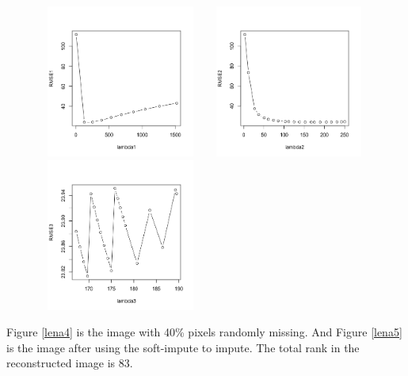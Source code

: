 \documentclass[12pt]{article}
\begin{document}
\begin{figure}[H]
	\centering
	\begin{minipage}[c]{0.32\textwidth}
		\centering
		\includegraphics[angle=0,width=5.5cm,height=5cm]{lena1}
		\caption{}\label{lena1}
	\end{minipage}
	\begin{minipage}[c]{0.32\textwidth}
		\centering
		\includegraphics[angle=0,width=5.5cm,height=5cm]{lena2}
		\caption{}\label{lena2}
	\end{minipage}
	\begin{minipage}[c]{0.32\textwidth}
		\centering
		\includegraphics[angle=0,width=5.5cm,height=5cm]{lena3}
		\caption{}\label{lena3}
	\end{minipage}
\end{figure}


Figure \ref{lena4} is the image with 40\% pixels randomly missing. And Figure \ref{lena5} is the image after using the soft-impute to impute. The total rank in the reconstructed image is 83.
\end{document}
